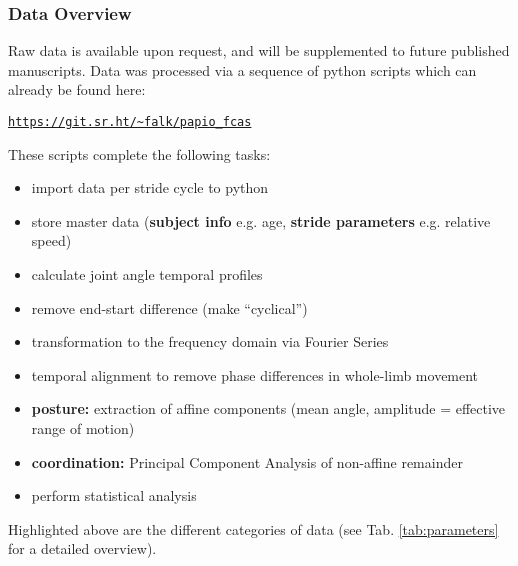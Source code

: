 \subsubsection{Data Overview}
\label{intro:dataprep}
Raw data is available upon request, and will be supplemented to future published manuscripts.
Data was processed via a sequence of python scripts which can already be found here: \begin{center}\href{https://git.sr.ht/\~falk/papio\_fcas}{\nolinkurl{https://git.sr.ht/~falk/papio_fcas}}\end{center}
These scripts complete the following tasks:
\begin{itemize}
\item import data per stride cycle to python
\item store master data (\textbf{subject info} e.g. age, \textbf{stride parameters} e.g. relative speed)
\item calculate joint angle temporal profiles
\item remove end-start difference (make ``cyclical'')
\item transformation to the frequency domain via Fourier Series
\item temporal alignment to remove phase differences in whole-limb movement
\item \textbf{posture:} extraction of affine components (mean angle, amplitude = effective range of motion)
\item \textbf{coordination:} Principal Component Analysis of non-affine remainder
\item perform statistical analysis
\end{itemize}


Highlighted above are the different categories of data (see Tab. \ref{tab:parameters} for a detailed overview).


